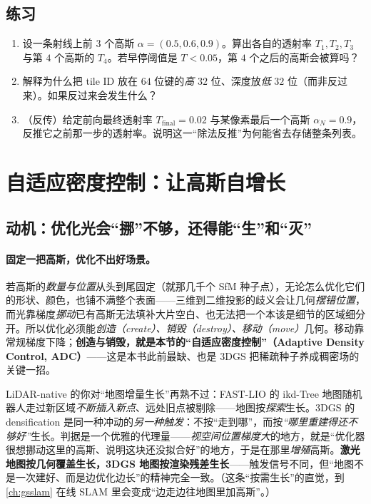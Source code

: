 \subsection*{练习}
\begin{enumerate}
  \item 设一条射线上前 $3$ 个高斯 $\alpha=(0.5,0.6,0.9)$。算出各自的透射率 $T_1,T_2,T_3$ 与第 $4$ 个高斯的 $T_4$。若早停阈值是 $T<0.05$，第 $4$ 个之后的高斯会被算吗？
  \item 解释为什么把 tile ID 放在 $64$ 位键的\emph{高} $32$ 位、深度放\emph{低} $32$ 位（而非反过来）。如果反过来会发生什么？
  \item （反传）给定前向最终透射率 $T_{\text{final}}=0.02$ 与某像素最后一个高斯 $\alpha_N=0.9$，反推它之前那一步的透射率。说明这一“除法反推”为何能省去存储整条列表。
\end{enumerate}

\section{自适应密度控制：让高斯自增长}
\label{sec:3dgs-density}

\subsection{动机：优化光会“挪”不够，还得能“生”和“灭”}

\paragraph{固定一把高斯，优化不出好场景。}
若高斯的\emph{数量与位置}从头到尾固定（就那几千个 SfM 种子点），无论怎么优化它们的形状、颜色，也铺不满整个表面——三维到二维投影的歧义会让几何\emph{摆错位置}，而光靠梯度\emph{挪动}已有高斯无法填补大片空白、也无法把一个本该是细节的区域细分开。所以优化必须能\emph{创造（create）、销毁（destroy）、移动（move）}几何。移动靠常规梯度下降；\textbf{创造与销毁，就是本节的“自适应密度控制”（Adaptive Density Control, ADC）}——这是本书此前最缺、也是 3DGS 把稀疏种子养成稠密场的关键一招。

\begin{insight}[densification $=$ 地图随“重建需求”增量生长，激光读者并不陌生]
LiDAR-native 的你对“地图增量生长”再熟不过：FAST-LIO 的 ikd-Tree 地图随机器人走过新区域\emph{不断插入新点}、远处旧点被剔除——地图按\emph{探索}生长。3DGS 的 densification 是同一种冲动的\emph{另一种触发}：不按“走到哪”，而按\emph{“哪里重建得还不够好”}生长。判据是一个优雅的代理量——\emph{视空间位置梯度大}的地方，就是“优化器很想挪动这里的高斯、说明这块还没拟合好”的地方，于是在那里\emph{增殖}高斯。\textbf{激光地图按几何覆盖生长，3DGS 地图按渲染残差生长}——触发信号不同，但“地图不是一次建好、而是边优化边长”的精神完全一致。（这条“按需生长”的直觉，到 \cref{ch:gsslam} 在线 SLAM 里会变成“边走边往地图里加高斯”。）
\end{insight}


